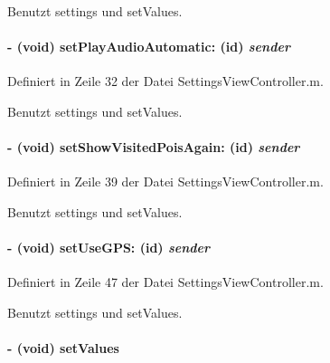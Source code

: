 Benutzt settings und setValues.\hypertarget{interface_settings_view_controller_a875f63db279319a3f72d4b078eddabcc}{
\paragraph[{setPlayAudioAutomatic:}]{\setlength{\rightskip}{0pt plus 5cm}-\/ (void) setPlayAudioAutomatic: (id) {\em sender}}\hfill}
\label{interface_settings_view_controller_a875f63db279319a3f72d4b078eddabcc}


Definiert in Zeile 32 der Datei SettingsViewController.m.

Benutzt settings und setValues.\hypertarget{interface_settings_view_controller_addbc1a6780c2787fb5af8f8cfcab6cad}{
\paragraph[{setShowVisitedPoisAgain:}]{\setlength{\rightskip}{0pt plus 5cm}-\/ (void) setShowVisitedPoisAgain: (id) {\em sender}}\hfill}
\label{interface_settings_view_controller_addbc1a6780c2787fb5af8f8cfcab6cad}


Definiert in Zeile 39 der Datei SettingsViewController.m.

Benutzt settings und setValues.\hypertarget{interface_settings_view_controller_a9bfcf40bc1e8ccefa7af46b38ad974fc}{
\paragraph[{setUseGPS:}]{\setlength{\rightskip}{0pt plus 5cm}-\/ (void) setUseGPS: (id) {\em sender}}\hfill}
\label{interface_settings_view_controller_a9bfcf40bc1e8ccefa7af46b38ad974fc}


Definiert in Zeile 47 der Datei SettingsViewController.m.

Benutzt settings und setValues.\hypertarget{interface_settings_view_controller_aced3c8535b61eb78231acf987570cd48}{
\paragraph[{setValues}]{\setlength{\rightskip}{0pt plus 5cm}-\/ (void) setValues }\hfill}
\label{interface_settings_view_controller_aced3c8535b61eb78231acf987570cd48}


